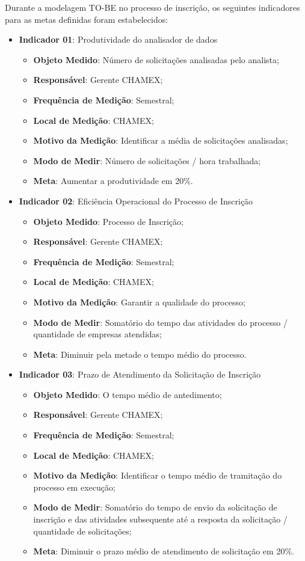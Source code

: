 Durante a modelagem TO-BE no processo de inscrição, os seguintes indicadores para as metas definidas foram estabelecidos:
\begin{itemize}
	\item{\textbf{Indicador 01}: Produtividade do analisador de dados
		\begin{itemize}
			\item{\textbf{Objeto Medido}: Número de solicitações analisadas pelo analista;}
			\item{\textbf{Responsável}: Gerente CHAMEX;}
			\item{\textbf{Frequência de Medição}: Semestral;}
			\item{\textbf{Local de Medição}: CHAMEX;}
			\item{\textbf{Motivo da Medição}: Identificar a média de solicitações analisadas;}
			\item{\textbf{Modo de Medir}: Número de solicitações / hora trabalhada;}
			\item{\textbf{Meta}: Aumentar a produtividade em 20\%.}
		\end{itemize}}
	\item{\textbf{Indicador 02}: Eficiência Operacional do Processo de Inscrição
		\begin{itemize}
			\item{\textbf{Objeto Medido}: Processo de Inscrição;}
			\item{\textbf{Responsável}: Gerente CHAMEX;}
			\item{\textbf{Frequência de Medição}: Semestral;}
			\item{\textbf{Local de Medição}: CHAMEX;}
			\item{\textbf{Motivo da Medição}: Garantir a qualidade do processo;}
			\item{\textbf{Modo de Medir}: Somatório do tempo das atividades do processo / quantidade de empresas atendidas;}
			\item{\textbf{Meta}: Diminuir pela metade o tempo médio do processo.}
		\end{itemize}}
	\item{\textbf{Indicador 03}: Prazo de Atendimento da Solicitação de Inscrição
		\begin{itemize}
			\item{\textbf{Objeto Medido}: O tempo médio de antedimento;}
			\item{\textbf{Responsável}: Gerente CHAMEX;}
			\item{\textbf{Frequência de Medição}: Semestral;}
			\item{\textbf{Local de Medição}: CHAMEX;}
			\item{\textbf{Motivo da Medição}: Identificar o tempo médio de tramitação do processo em execução;}
			\item{\textbf{Modo de Medir}: Somatório do tempo de envio da solicitação de inscrição e das atividades subsequente até a resposta da solicitação / quantidade de solicitações;}
			\item{\textbf{Meta}: Diminuir o prazo médio de atendimento de solicitação em 20\%.}
		\end{itemize}}
\end{itemize}